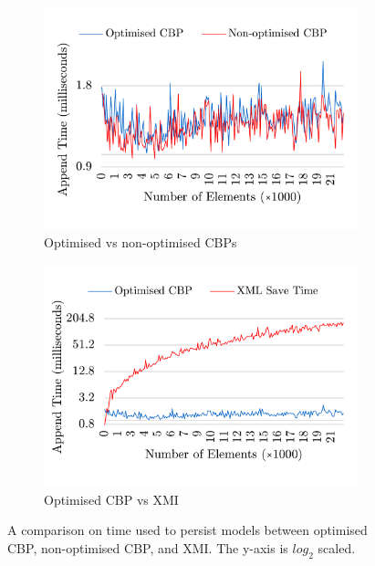 \documentclass[12pt, a4paper]{report} \usepackage[titletoc]{appendix}
\begin{document}
\begin{figure}[ht]	
	\begin{subfigure}[t]{0.5\linewidth}
		\includegraphics[width=\linewidth]{append_speed_conf}
		\caption{Optimised vs non-optimised CBPs}\label{fig:append_speed_conf}
	\end{subfigure}
	\hfill
	\begin{subfigure}[t]{0.5\linewidth}
		\includegraphics[width=\linewidth]{append_speed_conf_ocbp_xmi}
		\caption{Optimised CBP vs XMI}\label{fig:append_speed_conf_ocbp_xmi}		
	\end{subfigure}	
	\caption{A comparison on time used to persist models between optimised CBP, non-optimised CBP, and XMI. The y-axis is $log_2$ scaled.}
	\label{fig:append_speed}
\end{figure}
\end{document}
